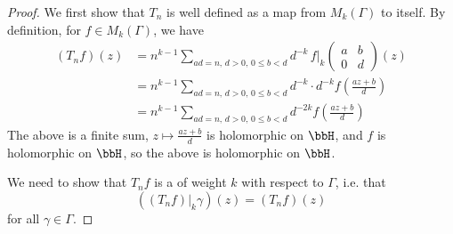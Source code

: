 \begin{proof}
    We first show that $T_n$ is well defined as a map from $M_k(\Gamma)$ to itself.
    By definition, for $f \in M_k(\Gamma)$, we have
    \begin{align*}
    (T_n f)(z) &= n^{k-1} \sum_{ad=n,\,d>0,\,0 \leq b < d} d^{-k}\, f\bigg|_k \begin{pmatrix} a & b \\ 0 & d \end{pmatrix}(z) \\
    &= n^{k-1} \sum_{ad=n,\,d>0,\,0 \leq b < d} d^{-k} \cdot d^{-k} f\left( \frac{az+b}{d} \right) \\
    &= n^{k-1} \sum_{ad=n,\,d>0,\,0 \leq b < d} d^{-2k} f\left( \frac{az+b}{d} \right)
    \end{align*}
    The above is a finite sum, $z \mapsto \frac{az+b}{d}$ is holomorphic on $\bbH$, and $f$ is holomorphic on $\bbH$, so the above is holomorphic on $\bbH$.

    We need to show that $T_n f$ is a  of weight $k$ with respect to $\Gamma$, i.e. that
    $$((T_n f)|_k \gamma)(z) = (T_n f)(z)$$
    for all $\gamma \in \Gamma$.
    
\end{proof}

